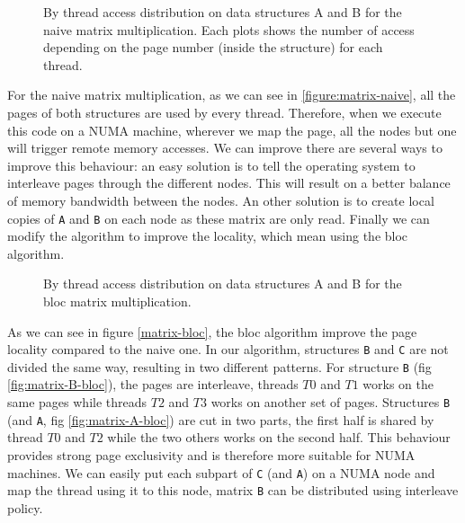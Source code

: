 \begin{figure}[htb]
    \centering
    \caption{By thread access distribution on data structures A and B for the
        naive matrix multiplication. Each plots shows the number of access
    depending on the page number (inside the structure) for each thread.}
    \label{fig:matrix-naive}
\end{figure}

For the naive matrix multiplication, as we can see in
\ref{figure:matrix-naive}, all the pages of both structures are used by every
thread. Therefore, when we execute this code on a NUMA machine, wherever we
map the page, all the nodes but one will trigger remote memory accesses. We
can improve there are several ways to improve this behaviour: an easy solution
is to tell the operating system to interleave pages through the different
nodes. This will result on a better balance of memory bandwidth between the
nodes. An other solution is to create local copies of \texttt{A} and
\texttt{B} on each node as these matrix are only read. Finally we can modify
the algorithm to improve the locality, which mean using the bloc algorithm.


\begin{figure}[htb]
    \centering
    \caption{By thread access distribution on data structures A and B for the
    bloc matrix multiplication.}
    \label{fig:matrix-bloc}
\end{figure}

As we can see in figure \ref{matrix-bloc}, the bloc algorithm improve the page
locality compared to the naive one. In our algorithm, structures
\texttt{B} and \texttt{C} are not divided the same way, resulting in two
different patterns. For structure \texttt{B} (fig \ref{fig:matrix-B-bloc}),
the pages are interleave, threads $T0$ and $T1$ works on the same pages while
threads $T2$ and $T3$ works on another set of pages. Structures \texttt{B} (and
\texttt{A}, fig \ref{fig:matrix-A-bloc}) are cut in two parts, the first half
is shared by thread $T0$ and $T2$ while the two others works on the second
half. This behaviour provides strong page exclusivity and is therefore more
suitable for NUMA machines. We can easily put each subpart of \texttt{C} (and
\texttt{A}) on a NUMA node and map the thread using it to this node, matrix
\texttt{B} can be distributed using interleave policy.


